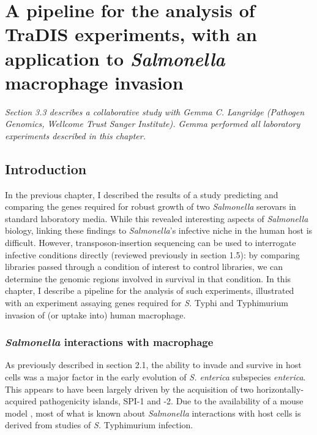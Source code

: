 
\chapter{A pipeline for the analysis of TraDIS experiments, with an application to {\it Salmonella} macrophage invasion}
\label{sec:chapterPingpong}
\ifpdf
    \graphicspath{{Chapter3/Chapter3Figs/EPS/}{Chapter3/Chapter3Figs/}}
\fi

\textit{Section 3.3 describes a collaborative study with Gemma C. Langridge (Pathogen Genomics, Wellcome Trust Sanger Institute). Gemma performed all laboratory experiments described in this chapter.}

\section{Introduction}

In the previous chapter, I described the results of a study predicting and comparing the genes required for robust growth of two \textit{Salmonella} serovars in standard laboratory media. While this revealed interesting aspects of \textit{Salmonella} biology, linking these findings to \textit{Salmonella}'s infective niche in the human host is difficult. However, transposon-insertion sequencing can be used to interrogate infective conditions directly (reviewed previously in section 1.5): by comparing libraries passed through a condition of interest to control libraries, we can determine the genomic regions involved in survival in that condition. In this chapter, I describe a pipeline for the analysis of such experiments, illustrated with an experiment assaying genes required for \textit{S.} Typhi and Typhimurium invasion of (or uptake into) human macrophage.

\subsection{\textit{Salmonella} interactions with macrophage}

As previously described in section 2.1, the ability to invade and survive in host cells was a major factor in the early evolution of \textit{S. enterica} subspecies \textit{enterica}. This appears to have been largely driven by the acquisition of two horizontally-acquired pathogenicity islands, SPI-1 and -2. Due to the availability of a mouse model \parencite{Santos2001}, most of what is known about \textit{Salmonella} interactions with host cells is derived from studies of \textit{S.} Typhimurium infection. 

